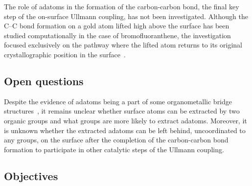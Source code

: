 \documentclass[%
 reprint,
 amsmath,amssymb,
 aps,
prb,
floatfix,
]{revtex4-2}
\newcommand{\lock}{\color{red}}
\newcommand{\lock}{\color{black}}
\begin{document}

{\lock

The role of adatoms in the formation of the carbon-carbon bond, the final key step of the on-surface Ullmann coupling, has not been investigated. Although the C--C bond formation on a gold atom lifted high above the surface has been studied computationally in the case of bromofluoranthene,
the investigation focused exclusively on the pathway where the lifted atom returns to its original crystallographic position in the surface~\cite{jpcc2018}. 

}

\ifdefined\INTERNAL

\subsection{Open questions}

\fi
{\lock

Despite the evidence of adatoms being a part of some organometallic bridge structures~\cite{acsnano2017, acsnano2019}, it remains unclear whether surface atoms can be extracted by two organic groups and what groups are more likely to extract adatoms. Moreover, it is unknown whether the extracted adatoms can be left behind, uncoordinated to any groups, on the surface after the completion of the carbon-carbon bond formation to participate in other catalytic steps of the Ullmann coupling.


}

\ifdefined\INTERNAL

\subsection{Objectives}
\end{document}
